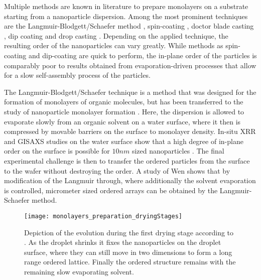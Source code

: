 \documentclass[\main/dresen_thesis.tex]{subfiles}
\begin{document}
  Multiple methods are known in literature to prepare monolayers on a substrate starting from a nanoparticle dispersion.
  Among the most prominent techniques are the Langmuir-Blodgett/Schaefer method \cite{Ukleev_2017_Selfa, Pauly_2011_Monol, Fried_2001_Order}, spin-coating \cite{Mishra_2012_Selfa}, doctor blade casting \cite{Bodnarchuk_2010_Large}, dip coating \cite{Kim_2002_Multi} and drop casting \cite{Bigioni_2006_Kinet}.
  Depending on the applied technique, the resulting order of the nanoparticles can vary greatly.
  While methods as spin-coating and dip-coating are quick to perform, the in-plane order of the particles is comparably poor to results obtained from evaporation-driven processes that allow for a slow self-assembly process of the particles.

  The Langmuir-Blodgett/Schaefer technique is a method that was designed for the formation of monolayers of organic molecules, but has been transferred to the study of nanoparticle monolayer formation \cite{Heitsch_2010_Gisax, Vorobiev_2015_Subst}.
  Here, the dispersion is allowed to evaporate slowly from an organic solvent on a water surface, where it then is compressed by movable barriers on the surface to monolayer density.
  In-situ XRR and GISAXS studies on the water surface show that a high degree of in-plane order on the surface is possible for $10 \unit{nm}$ sized nanoparticles \cite{Vorobiev_2015_Subst}.
  The final experimental challenge is then to transfer the ordered particles from the surface to the wafer without destroying the order.
  A study of Wen \etal \cite{Wen_2011_Ultral} shows that by modification of the Langmuir through, where additionally the solvent evaporation is controlled, micrometer sized ordered arrays can be obtained by the Langmuir-Schaefer method.


  \begin{figure}[tb]
    \centering
    \texttt{[image: monolayers\_preparation\_dryingStages]}
    \caption{\label{fig:monolayers:preparation:dryingConditions:dryingStages} Depiction of the evolution during the first drying stage according to \cite{Bigioni_2006_Kinet}. As the droplet shrinks it fixes the nanoparticles on the droplet surface, where they can still move in two dimensions to form a long range ordered lattice. Finally the ordered structure remains with the remaining slow evaporating solvent.}
  \end{figure}
\end{document}
